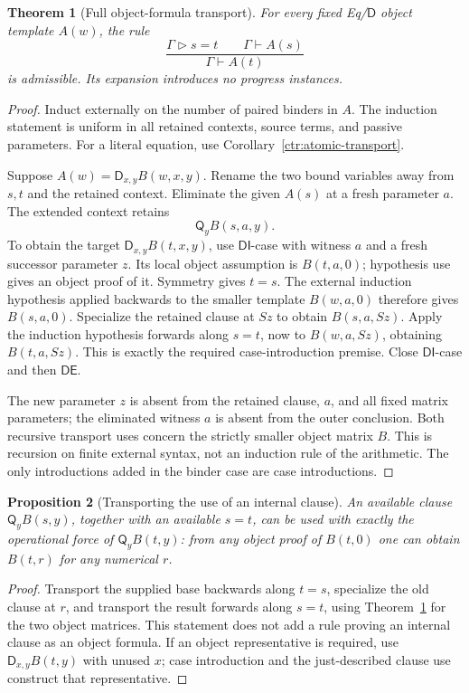 \documentclass[11pt,letterpaper]{article}
\newtheorem{theorem}{Theorem}[section]
\newtheorem{proposition}[theorem]{Proposition}
\theoremstyle{definition}\newtheorem{definition}[theorem]{Definition}
\theoremstyle{remark}\newtheorem{remark}[theorem]{Remark}
\begin{document}
\begin{theorem}[Full object-formula transport]
\label{ctr:full-transport}\label{thm:atomic-transport}
For every fixed Eq/$\mathsf D$ object template $A(w)$, the rule
\[
 \frac{\Gamma\mathrel{\triangleright}s=t\qquad
       \Gamma\vdash A(s)}
      {\Gamma\vdash A(t)}
 \tag{Object transport}
\]
is admissible. Its expansion introduces no progress instances.
\end{theorem}
\begin{proof}
Induct externally on the number of paired binders in $A$. The induction
statement is uniform in all retained contexts, source terms, and passive
parameters. For a literal equation, use
Corollary~\ref{ctr:atomic-transport}.

Suppose $A(w)=\mathsf D_{x,y}B(w,x,y)$. Rename the two bound
variables away from $s,t$ and the retained context. Eliminate the given
$A(s)$ at a fresh parameter $a$. The extended context retains
\[
                     \mathsf Q_y B(s,a,y).
\]
To obtain the target $\mathsf D_{x,y}B(t,x,y)$, use
$\mathsf{DI}$-case with witness $a$ and a fresh successor parameter
$z$. Its local object assumption is $B(t,a,0)$; hypothesis use gives
an object proof of it. Symmetry gives $t=s$. The external induction
hypothesis applied backwards to the smaller template $B(w,a,0)$
therefore gives $B(s,a,0)$. Specialize the retained clause at $Sz$ to
obtain $B(s,a,Sz)$. Apply the induction hypothesis forwards along
$s=t$, now to $B(w,a,Sz)$, obtaining $B(t,a,Sz)$. This is exactly
the required case-introduction premise. Close $\mathsf{DI}$-case and
then $\mathsf{DE}$.

The new parameter $z$ is absent from the retained clause, $a$, and all
fixed matrix parameters; the eliminated witness $a$ is absent from the
outer conclusion. Both recursive transport uses concern the strictly
smaller object matrix $B$. This is recursion on finite external syntax,
not an induction rule of the arithmetic. The only introductions added
in the binder case are case introductions.
\end{proof}

\begin{proposition}[Transporting the use of an internal clause]
\label{ctr:clause-transport}
An available clause $\mathsf Q_yB(s,y)$, together with an available
$s=t$, can be used with exactly the operational force of
$\mathsf Q_yB(t,y)$: from any object proof of $B(t,0)$ one can
obtain $B(t,r)$ for any numerical $r$.
\end{proposition}
\begin{proof}
Transport the supplied base backwards along $t=s$, specialize the old
clause at $r$, and transport the result forwards along $s=t$, using
Theorem~\ref{ctr:full-transport} for the two object matrices.
This statement does not add a rule proving an internal clause as an
object formula. If an object representative is required, use
$\mathsf D_{x,y}B(t,y)$ with unused $x$; case introduction and the
just-described clause use construct that representative.
\end{proof}
\end{document}
